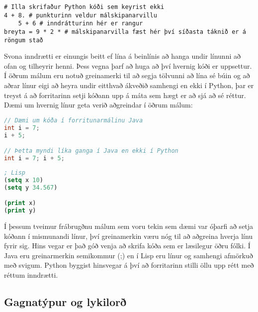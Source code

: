 \begin{lstlisting}[caption=Rangur Python kóði sem veldur villu, label=lst:inng-malskipanarvilla]
# Illa skrifaður Python kóði sem keyrist ekki
4 + 8. # punkturinn veldur málskipanarvillu
	5 + 6 # inndrátturinn hér er rangur
breyta = 9 * 2 * # málskipanarvilla fæst hér því síðasta táknið er á röngum stað
\end{lstlisting}

Svona inndrætti er einungis beitt ef lína á beinlínis að hanga undir línunni að ofan og tilheyrir henni. 
Þess vegna þarf að huga að því hvernig kóði er uppsettur. 
Í öðrum málum eru notuð greinamerki til að segja tölvunni að lína sé búin og að aðrar línur eigi að heyra undir eitthvað ákveðið samhengi en ekki í Python, þar er treyst á að forritarinn setji kóðann upp á máta sem hægt er að sjá að sé réttur. 
Dæmi um hvernig línur geta verið aðgreindar í öðrum málum:

\begin{lstlisting}[language=Java , caption=Dæmi um annað mál sem er strangt tagað og með greinamerkjum]
// Dæmi um kóða í forritunarmálinu Java
int i = 7;
i + 5;

// Þetta myndi líka ganga í Java en ekki í Python
int i = 7; i + 5;
\end{lstlisting}

\begin{lstlisting}[language=Lisp, caption=Dæmi um annað mál sem byggir á afmörkuðu samhengi en með greinamerkjum]
; Lisp
(setq x 10)
(setq y 34.567)

(print x)
(print y)
\end{lstlisting}

Í þessum tveimur frábrugðnu málum sem voru tekin sem dæmi var óþarfi að setja kóðann í mismunandi línur, því greinamerkin væru nóg til að aðgreina hverja línu fyrir sig. 
Hins vegar er það góð venja að skrifa kóða sem er læsilegur öðru fólki. Í Java eru greinarmerkin semikommur (;) en í Lisp eru línur og samhengi afmörkuð með svigum. 
Python byggist hinsvegar á því að forritarinn stilli öllu upp rétt með réttum inndrætti. 

\subsection{Gagnatýpur og lykilorð}

